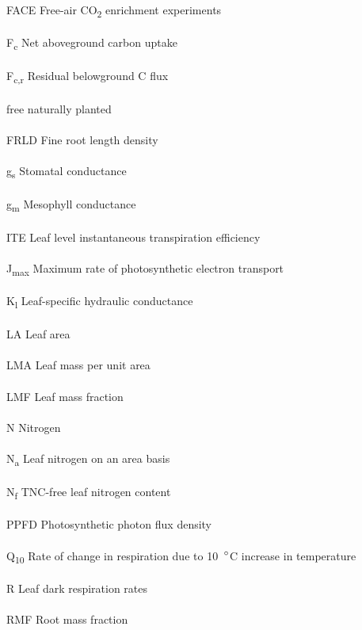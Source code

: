 \documentclass[a4paper]{article}\usepackage[]{graphicx}\usepackage[]{color}
\begin{document}
\\
FACE Free-air CO\textsubscript{2} enrichment experiments
\\
\\
F\textsubscript{c}  Net aboveground carbon uptake
\\
\\
F\textsubscript{c,r}  Residual belowground C flux
\\
\\
free  naturally planted
\\
\\
FRLD Fine root length density
\\
\\
g\textsubscript{s}  Stomatal conductance
\\
\\
g\textsubscript{m}  Mesophyll conductance
\\
\\
ITE Leaf level instantaneous transpiration efficiency
\\
\\
J\textsubscript{max} Maximum rate of photosynthetic electron transport 
\\
\\
K\textsubscript{l} Leaf-specific hydraulic conductance 
\\
\\
LA Leaf area
\\
\\
LMA Leaf mass per unit area
\\
\\
LMF Leaf mass fraction
\\
\\
N  Nitrogen
\\
\\
N\textsubscript{a} Leaf nitrogen on an area basis
\\
\\
N\textsubscript{f} TNC-free leaf nitrogen content
\\
\\
PPFD  Photosynthetic photon flux density
\\
\\
Q\textsubscript{10} Rate of change in respiration due to 10~$\degree$C increase in temperature
\\
\\
R Leaf dark respiration rates
\\
\\
RMF Root mass fraction
\\
\\
\end{document}
